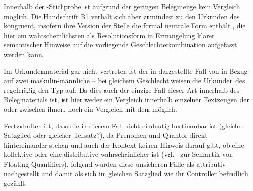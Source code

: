 Innerhalb der \KC{}-Stichprobe ist aufgrund der geringen Belegmenge
kein Vergleich möglich. Die Handschrift B1 verhält sich aber
zumindest zu den Urkunden des \CAO{} kongruent, insofern ihre Version
der Stelle die formal neutrale Form  enthält
, die hier am wahrscheinlichsten als Resolutionsform in
Ermangelung klarer semantischer Hinweise auf die vorliegende
Geschlechterkombination aufgefasst werden kann.

Im Urkundenmaterial gar nicht vertreten ist der in 
dargestellte Fall von  in Bezug auf zwei maskulin-männliche
 -- bei gleichem Geschlecht weisen die Urkunden des
\CAO{} regelmäßig den Typ  auf. Da dies auch der einzige Fall
dieser Art innerhalb des \KC{}-Belegmaterials ist, ist hier weder ein Vergleich
innerhalb einzelner Textzeugen der \KC{} oder zwischen ihnen, noch ein
Vergleich mit dem \CAO{} möglich.

\begin{exe}
\end{exe}

Festzuhalten ist, dass die  in diesem Fall nicht
eindeutig bestimmbar ist (gleiches Satzglied oder gleicher
Teilsatz?), da Pronomen und Quantor direkt hintereinander stehen und auch der
Kontext keinen Hinweis darauf gibt, ob eine kollektive oder eine distributive
 wahrscheinlicher ist (vgl.~ zur Semantik
von Floating Quantifiers). \citet[623]{ksw2} folgend
wurden diese unsicheren Fälle als attributiv nachgestellt und
damit als sich im gleichen Satzglied wie ihr Controller befindlich gezählt.

